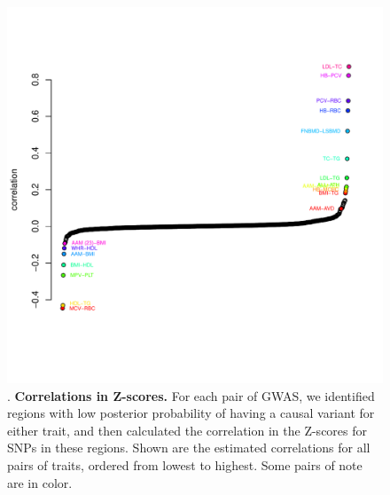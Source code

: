 \documentclass[11pt,titlepage]{article}
\begin{document}
\begin{figure}
\begin{center}
\includegraphics[scale = 0.6]{figs/cor.pdf}
\caption{. \textbf{Correlations in Z-scores.} For each pair of GWAS, we identified regions with low posterior probability of having a causal variant for either trait, and then calculated the correlation in the Z-scores for SNPs in these regions. Shown are the estimated correlations for all pairs of traits, ordered from lowest to highest. Some pairs of note are in color.}\label{f_cor}
\end{center}
\end{figure}
\end{document}
